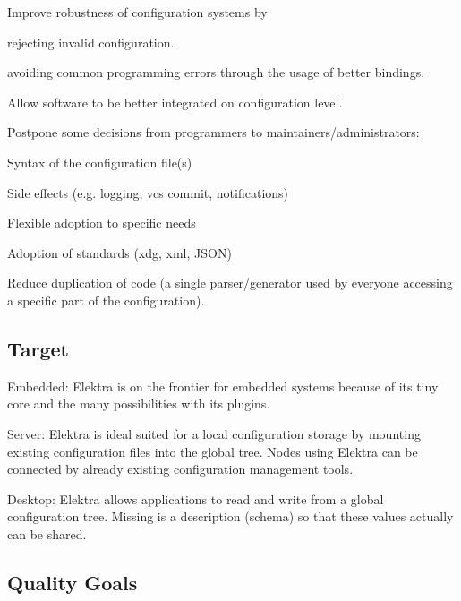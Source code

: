 
\begin{DoxyItemize}
\item Improve robustness of configuration systems by
\begin{DoxyItemize}
\item rejecting invalid configuration.
\item avoiding common programming errors through the usage of better bindings.
\end{DoxyItemize}
\item Allow software to be better integrated on configuration level.
\item Postpone some decisions from programmers to maintainers/administrators\+:
\begin{DoxyItemize}
\item Syntax of the configuration file(s)
\item Side effects (e.\+g. logging, vcs commit, notifications)
\item Flexible adoption to specific needs
\item Adoption of standards (xdg, xml, J\+S\+ON)
\end{DoxyItemize}
\item Reduce duplication of code (a single parser/generator used by everyone accessing a specific part of the configuration).
\end{DoxyItemize}

\subsection*{Target}


\begin{DoxyItemize}
\item Embedded\+: Elektra is on the frontier for embedded systems because of its tiny core and the many possibilities with its plugins.
\item Server\+: Elektra is ideal suited for a local configuration storage by mounting existing configuration files into the global tree. Nodes using Elektra can be connected by already existing configuration management tools.
\item Desktop\+: Elektra allows applications to read and write from a global configuration tree. Missing is a description (schema) so that these values actually can be shared.
\end{DoxyItemize}

\subsection*{Quality Goals}

